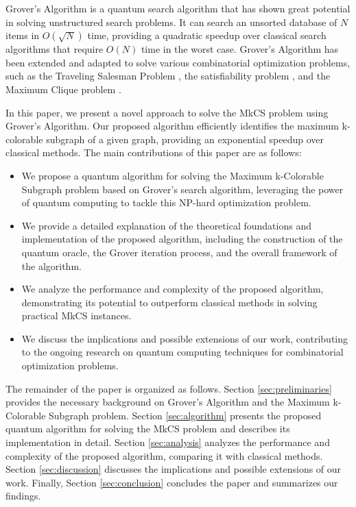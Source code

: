Grover's Algorithm \cite{grover1996} is a quantum search algorithm that has shown great potential in solving unstructured search problems. It can search an unsorted database of $N$ items in $O(\sqrt{N})$ time, providing a quadratic speedup over classical search algorithms that require $O(N)$ time in the worst case. Grover's Algorithm has been extended and adapted to solve various combinatorial optimization problems, such as the Traveling Salesman Problem \cite{zalka1999}, the satisfiability problem \cite{cerf2000}, and the Maximum Clique problem \cite{childs2000}.

In this paper, we present a novel approach to solve the MkCS problem using Grover's Algorithm. Our proposed algorithm efficiently identifies the maximum k-colorable subgraph of a given graph, providing an exponential speedup over classical methods. The main contributions of this paper are as follows:

\begin{itemize}
    \item We propose a quantum algorithm for solving the Maximum k-Colorable Subgraph problem based on Grover's search algorithm, leveraging the power of quantum computing to tackle this NP-hard optimization problem.
    
    \item We provide a detailed explanation of the theoretical foundations and implementation of the proposed algorithm, including the construction of the quantum oracle, the Grover iteration process, and the overall framework of the algorithm.
    
    \item We analyze the performance and complexity of the proposed algorithm, demonstrating its potential to outperform classical methods in solving practical MkCS instances.
    
    \item We discuss the implications and possible extensions of our work, contributing to the ongoing research on quantum computing techniques for combinatorial optimization problems.
\end{itemize}

The remainder of the paper is organized as follows. Section \ref{sec:preliminaries} provides the necessary background on Grover's Algorithm and the Maximum k-Colorable Subgraph problem. Section \ref{sec:algorithm} presents the proposed quantum algorithm for solving the MkCS problem and describes its implementation in detail. Section \ref{sec:analysis} analyzes the performance and complexity of the proposed algorithm, comparing it with classical methods. Section \ref{sec:discussion} discusses the implications and possible extensions of our work. Finally, Section \ref{sec:conclusion} concludes the paper and summarizes our findings.



